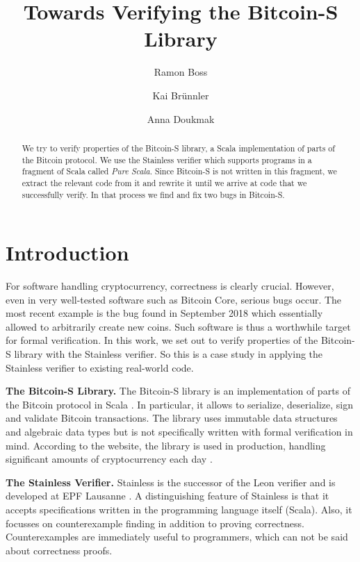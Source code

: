 \documentclass[hyphens, a4paper,USenglish,cleveref, autoref, thm-restate]{oasics-v2019}
\title{Towards Verifying the Bitcoin-S Library}
\author{Ramon Boss}{Bern University of Applied Sciences, Switzerland}{ramon.boss@outlook.com}{}{}
\author{Kai Brünnler}{Bern University of Applied Sciences, Switzerland}{kai.bruennler@bfh.ch}{}{}
\author{Anna Doukmak}{Bern University of Applied Sciences, Switzerland}{anna.doukmak@gmail.com}{}{}
\renewcommand{\paragraph}{\textbf}%
\begin{document}
\maketitle

\begin{abstract}
  We try to verify properties of the Bitcoin-S library, a Scala
  implementation of parts of the Bitcoin protocol. We use the
  Stainless verifier which supports programs in a fragment of Scala
  called \emph{Pure Scala}. Since Bitcoin-S is not written in this
  fragment, we extract the relevant code from it and rewrite it until
  we arrive at code that we successfully verify. In that process we
  find and fix two bugs in Bitcoin-S.
\end{abstract}

\section{Introduction}

For software handling cryptocurrency, correctness is clearly crucial.
However, even in very well-tested software such as Bitcoin Core,
serious bugs occur. The most recent example is the bug found in
September 2018 \cite{cve201817144} which essentially allowed to
arbitrarily create new coins. Such software is thus a worthwhile
target for formal verification. In this work, we set out to verify
properties of the Bitcoin-S library with the Stainless verifier. So
this is a case study in applying the Stainless verifier to existing
real-world code.

\paragraph{The Bitcoin-S Library.} The Bitcoin-S library is an
implementation of parts of the Bitcoin protocol in Scala
\cite{BitcoinS:website,BitcoinS:github}. In particular, it allows to
serialize, deserialize, sign and validate Bitcoin transactions. The
library uses immutable data structures and algebraic data types but is
not specifically written with formal verification in mind. According
to the website, the library is used in production, handling
significant amounts of cryptocurrency each day
\cite{BitcoinS:website}.

\paragraph{The Stainless Verifier.} Stainless is the successor of the
Leon verifier and is developed at EPF Lausanne
\cite{DBLP:conf/ecoop/BlancKKS13,DBLP:conf/pldi/VoirolKK15,DBLP:conf/pldi/BlancK15}.
A distinguishing feature of Stainless is that it accepts
specifications written in the programming language itself
(Scala). Also, it focusses on counterexample finding in addition to
proving correctness. Counterexamples are immediately useful to
programmers, which can not be said about correctness proofs.
\end{document}

